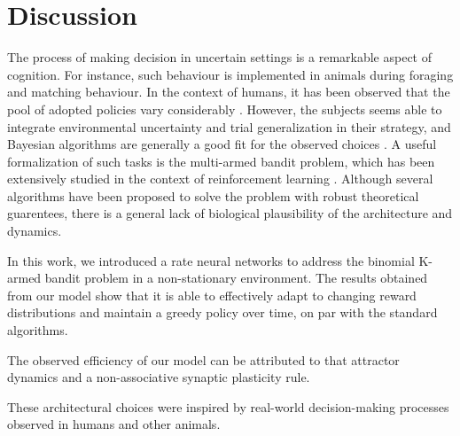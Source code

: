 
\section{Discussion}


The process of making decision in uncertain settings is a remarkable aspect of cognition. For instance, such behaviour is implemented in animals during foraging and matching behaviour.
In the context of humans, it has been observed that the pool of adopted policies vary considerably \cite{steyversBayesianAnalysisHuman2009a}. However, the subjects seems able to integrate environmental uncertainty and trial generalization in their strategy, and Bayesian algorithms are generally a
good fit for the observed choices \cite{schulzFindingStructureMultiarmed2020, zhangForgetfulBayesMyopic2013}.
A useful formalization of such tasks is the multi-armed bandit problem, which has been extensively studied in the context of reinforcement learning \cite{suttonReinforcementLearningProblem1998}.
Although several algorithms have been proposed to solve the problem with robust theoretical guarentees, there is a general lack of biological plausibility of the architecture and dynamics.

%
In this work, we introduced a rate neural networks to address the binomial K-armed bandit problem in a non-stationary environment.
The results obtained from our model show that it is able to effectively adapt to changing reward distributions and maintain a greedy policy over time, on par with the standard algorithms.

The observed efficiency of our model can be attributed to that attractor dynamics and a non-associative synaptic plasticity rule.

These architectural choices were inspired by real-world decision-making processes observed in humans and other animals.



